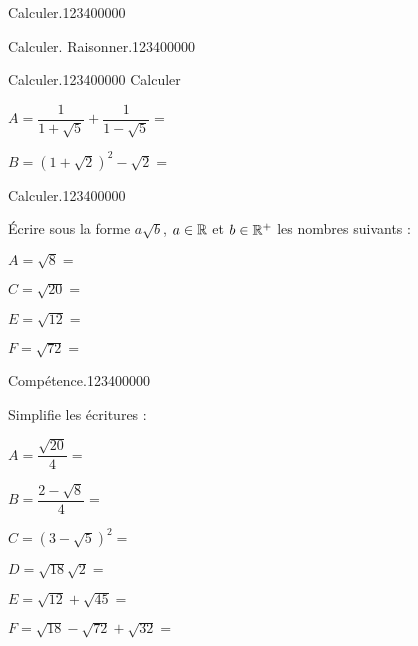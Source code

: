 \begin{pageAD}  %
\restoregeometry %


\begin{ExoCad}{Calculer.}{1234}{0}{0}{0}{0}{0}

 
 
 
\end{ExoCad}

 
\begin{ExoCad}{Calculer. Raisonner.}{1234}{0}{0}{0}{0}{0}




\end{ExoCad}





\begin{ExoCad}{Calculer.}{1234}{0}{0}{0}{0}{0}
Calculer \vspace{0.4cm}

$A=\dfrac{1}{1+\sqrt5} +\dfrac{1}{1-\sqrt5} = $ 

$B=\left(1+\sqrt2\right)^2  -\sqrt2 = $ 
\end{ExoCad}


\begin{ExoCad}{Calculer.}{1234}{0}{0}{0}{0}{0}
 
Écrire sous la forme $a\sqrt{b}$, $a\in\mathbb R$ et $b \in \mathbb R^+$ les nombres suivants : \vspace{0.4cm}

\begin{minipage}{0.5\linewidth}
$A = \sqrt{8}=$  
 
$C=\sqrt{20}=$   
\end{minipage}
\vrule
\begin{minipage}{0.5\linewidth}
$E=\sqrt{12}=$   

$F=\sqrt{72}=$  
\end{minipage}
 
\end{ExoCad}


\begin{ExoCad}{Compétence.}{1234}{0}{0}{0}{0}{0}
 

Simplifie les écritures : \vspace{0.4cm}

$A=\dfrac{\sqrt{20}}{4}=$  

$B = \dfrac{2-\sqrt{8}}{4}=$ 

$C=\left( 3-\sqrt{5}\right)^2=$  

$D=\sqrt{18}\sqrt{2}=$   

 $E=\sqrt{12}+\sqrt{45}=$  
 
 $F=\sqrt{18} -\sqrt{72} +\sqrt{32}=$ 
\end{ExoCad}
 
 
 
\end{pageAD} %

